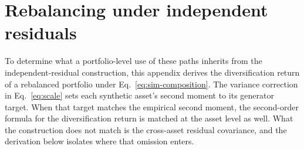 \section{Rebalancing under independent residuals}
\label{sec:supp-bias}

To determine what a portfolio-level use of these paths inherits from
the independent-residual construction, this appendix derives the
diversification return of a rebalanced portfolio under
Eq.~\eqref{eq:sim-composition}. The variance correction in
Eq.~\eqref{eq:scale} sets each synthetic asset's second moment to its
generator target. When that target matches the empirical second
moment, the second-order formula for the diversification return is
matched at the asset level as well. What the construction does not
match is the cross-asset residual covariance, and the derivation below
isolates where that omission enters.

